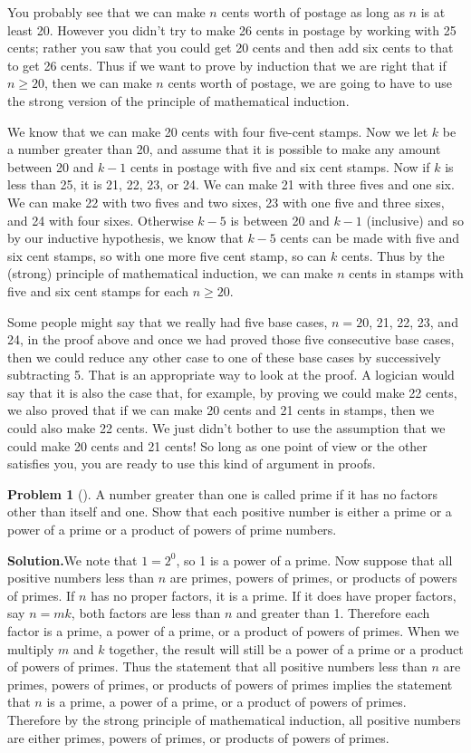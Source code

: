 \documentclass[10pt,]{book}
\theoremstyle{plain}
\theoremstyle{definition}
\newtheorem{activity}[project]{Problem}
\theoremstyle{definition}
\numberwithin{equation}{chapter}
\begin{document}
You probably see that we can make \(n\) cents worth of postage as long as \(n\) is at least 20. However you didn't try to make 26 cents in postage by working with 25 cents; rather you saw that you could get 20 cents and then add six cents to that to get 26 cents. Thus if we want to prove by induction that we are right that if \(n\ge 20\), then we can make \(n\) cents worth of postage, we are going to have to use the strong version of the principle of mathematical induction.%
\par
We know that we can make 20 cents with four five-cent stamps. Now we let \(k\) be a number greater than 20, and assume that it is possible to make any amount between 20 and \(k-1\) cents in postage with five and six cent stamps. Now if \(k\) is less than 25, it is 21, 22, 23, or 24. We can make 21 with three fives and one six. We can make 22 with two fives and two sixes, 23 with one five and three sixes, and 24 with four sixes. Otherwise \(k-5\) is between 20 and \(k-1\) (inclusive) and so by our inductive hypothesis, we know that \(k-5\) cents can be made with five and six cent stamps, so with one more five cent stamp, so can \(k\) cents. Thus by the (strong) principle of mathematical induction, we can make \(n\) cents in stamps with five and six cent stamps for each \(n\ge 20\).%
\par
Some people might say that we really had five base cases, \(n=20\), 21, 22, 23, and 24, in the proof above and once we had proved those five consecutive base cases, then we could reduce any other case to one of these base cases by successively subtracting 5. That is an appropriate way to look at the proof. A logician would say that it is also the case that, for example, by proving we could make 22 cents, we also proved that if we can make 20 cents and 21 cents in stamps, then we could also make 22 cents. We just didn't bother to use the assumption that we could make 20 cents and 21 cents! So long as one point of view or the other satisfies you, you are ready to use this kind of argument in proofs.%
\begin{activity}[]\label{activity-368}
A number greater than one is called prime if it has no factors other than itself and one. Show that each positive number is either a prime or a power of a prime or a product of powers of prime numbers.%
\par\medskip\noindent%
\textbf{Solution.}\quad We note that \(1=2^0\), so 1 is a power of a prime. Now suppose that all positive numbers less than \(n\) are primes, powers of primes, or products of powers of primes. If \(n\) has no proper factors, it is a prime.  If it does have proper factors, say \(n=mk\), both factors are less than \(n\) and greater than 1. Therefore each factor is a prime, a power of a prime, or a product of powers of primes. When we multiply \(m\) and \(k\) together, the result will still be a power of a prime or a product of powers of primes. Thus the statement that all positive numbers less than \(n\) are primes, powers of primes, or products of powers of primes implies the statement that \(n\) is a prime, a power of a prime, or a product of powers of primes. Therefore by the strong principle of mathematical induction, all positive numbers are either primes, powers of primes, or products of powers of primes.%
\end{activity}
\end{document}
